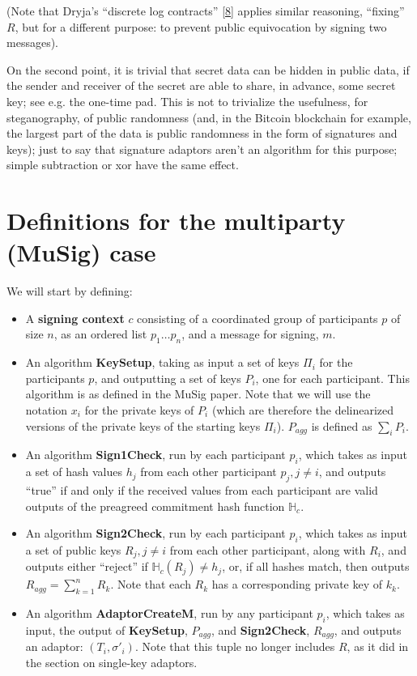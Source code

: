 \documentclass[10pt,a4paper]{article}
\begin{document}
\vspace{5 pt}

(Note that Dryja's ``discrete log contracts'' {[}\protect\hyperlink{anchor-8}{8}{]} applies similar reasoning, ``fixing'' $R$, but for a different purpose: to prevent public equivocation by signing two messages).

\vspace{5 pt}

On the second point, it is trivial that secret data can be hidden in public data, if the sender and receiver of the secret are able to share, in advance, some secret key; see e.g. the one-time pad. This is not to trivialize the usefulness, for steganography, of public randomness (and, in the Bitcoin blockchain for example, the largest part of the data is public randomness in the form of signatures and keys); just to say that signature adaptors aren't an algorithm for this purpose; simple subtraction or xor have the same effect.

\section{Definitions for the multiparty (MuSig) case}

We will start by defining:

\begin{itemize}
\item A \textbf{signing context} $c$ consisting of a coordinated group of participants $p$ of size $n$, as an ordered list $p_1 \ldots p_n$, and a message for signing, $m$.
\item An algorithm \textbf{KeySetup}, taking as input a set of keys ${\Pi_i}$ for the participants $p$, and outputting a set of keys $P_i$, one for each participant. This algorithm is as defined in the MuSig paper. Note that we will use the notation $x_i$ for the private keys of $P_i$ (which are therefore the delinearized versions of the private keys of the starting keys $\Pi_i$). $P_{agg}$ is defined as $\sum_i P_i$.
\item An algorithm \textbf{Sign1Check}, run by each participant $p_i$, which takes as input a set of hash values $h_j$ from each other participant $p_j, j \neq i$, and outputs ``true'' if and only if the received values from each participant are valid outputs of the preagreed commitment hash function $\mathbb{H}_c$.
\item An algorithm \textbf{Sign2Check}, run by each participant $p_i$, which takes as input a set of public keys $R_j, j \neq i$ from each other participant, along with $R_i$, and outputs either ``reject'' if $\mathbb{H}_c(R_j) \neq h_j$, or, if all hashes match, then outputs $R_{agg} = \sum_{k=1}^{n} R_k$. Note that each $R_k$ has a corresponding private key of $k_k$.
\item An algorithm \textbf{AdaptorCreateM}, run by any participant $p_i$, which takes as input, the output of \textbf{KeySetup}, $P_{agg}$, and \textbf{Sign2Check}, $R_{agg}$, and outputs an adaptor: $(T_i, \sigma'_i)$. Note that this tuple no longer includes $R$, as it did in the section on single-key adaptors.
\end{itemize}
\end{document}
